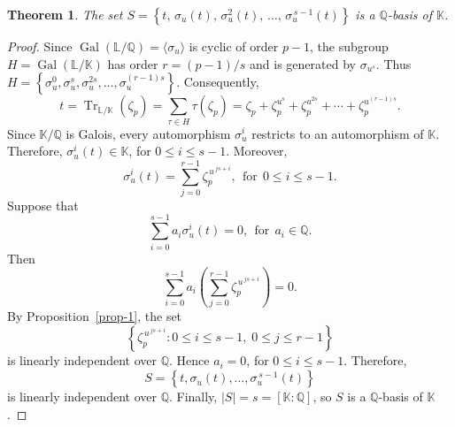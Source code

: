 \documentclass{amsart}
\newtheorem{theorem}{Theorem}
\begin{document}
\begin{theorem}\label{teo-1} The set $S = \left\{t,\,\sigma_u(t),\,\sigma_u^{2}(t),\,\ldots,\,\sigma_u^{\,s-1}(t)\right\}$ is a $\mathbb{Q}$-basis of $\mathbb{K}$. \end{theorem}
\begin{proof} Since $\operatorname{Gal}(\mathbb{L}/\mathbb{Q}) = \langle\sigma_u\rangle$ is cyclic of order $p-1$, the subgroup $H=\operatorname{Gal}(\mathbb{L}/\mathbb{K})$
has order $r=(p-1)/s$ and is generated by $\sigma_{u^s}$. Thus $H = \left\{ \sigma_u^0,\sigma_{u}^s,\sigma_{u}^{2s},\ldots,\sigma_{u}^{(r-1)s}\right\}$. Consequently, \[ t = \operatorname{Tr}_{\mathbb{L}/\mathbb{K}}(\zeta_p) = \sum_{\tau\in H}\tau(\zeta_p) =
\zeta_p+\zeta_p^{u^s}+\zeta_p^{u^{2s}}+\cdots+\zeta_p^{u^{(r-1)s}}. \] Since $\mathbb{K}/\mathbb{Q}$ is Galois, every automorphism $\sigma_u^i$ restricts to an automorphism of $\mathbb{K}$. Therefore,
$\sigma_u^i(t)\in\mathbb{K}$, for $0\le i\le s-1$. Moreover, \[ \sigma_u^i(t) = \sum_{j=0}^{r-1} \zeta_p^{\,u^{\,js+i}}, \ \ \mbox{for} \ \ 0\le i\le s-1. \]
Suppose that \[ \sum_{i=0}^{s-1} a_i\sigma_u^i(t)=0, \ \ \mbox{for} \ \ a_i\in\mathbb{Q}. \] Then \[ \sum_{i=0}^{s-1} a_i \left(
\sum_{j=0}^{r-1} \zeta_p^{\,u^{\,js+i}} \right) = 0. \] By Proposition~\ref{prop-1}, the set \[ \left\{ \zeta_p^{\,u^{\,js+i}}: 0\le i\le s-1,\; 0\le j\le r-1\right\} \]
is linearly independent over $\mathbb{Q}$. Hence $a_i=0$, for $0\le i\le s-1$. Therefore, \[ S = \left\{ t,\sigma_u(t),\ldots,\sigma_u^{\,s-1}(t) \right\} \] is linearly independent over $\mathbb{Q}$.
Finally, $|S| = s = [\mathbb{K}:\mathbb{Q}]$, so $S$ is a $\mathbb{Q}$-basis of $\mathbb{K}$. \end{proof}
\end{document}
